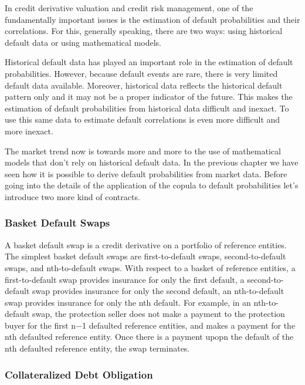 \documentclass[11pt]{article}
\begin{document}
In credit derivative valuation and credit risk management, one of the
fundamentally important issues is the estimation of default
probabilities and their correlations. For this, generally speaking,
there are two ways: using historical default data or using mathematical
models.

Historical default data has played an important role in the estimation
of default probabilities. However, because default events are rare,
there is very limited default data available. Moreover, historical data
reflects the historical default pattern only and it may not be a proper
indicator of the future. This makes the estimation of default
probabilities from historical data difficult and inexact. To use this
same data to estimate default correlations is even more difficult and
more inexact.

The market trend now is towards more and more to the use of mathematical
models that don't rely on historical default data. In the previous
chapter we have seen how it is possible to derive default probabilities
from market data. Before going into the details of the application of
the copula to default probabilities let's introduce two more kind of
contracts.

\hypertarget{basket-default-swaps}{%
\subsubsection{Basket Default Swaps}\label{basket-default-swaps}}

A basket default swap is a credit derivative on a portfolio of reference
entities. The simplest basket default swaps are first-to-default swaps,
second-to-default swaps, and nth-to-default swaps. With respect to a
basket of reference entities, a first-to-default swap provides insurance
for only the first default, a second-to-default swap provides insurance
for only the second default, an nth-to-default swap provides insurance
for only the nth default. For example, in an nth-to-default swap, the
protection seller does not make a payment to the protection buyer for
the first n−1 defaulted reference entities, and makes a payment for the
nth defaulted reference entity. Once there is a payment upopn the
default of the nth defaulted reference entity, the swap terminates.

\hypertarget{collateralized-debt-obligation}{%
\subsubsection{Collateralized Debt
Obligation}\label{collateralized-debt-obligation}}
\end{document}
